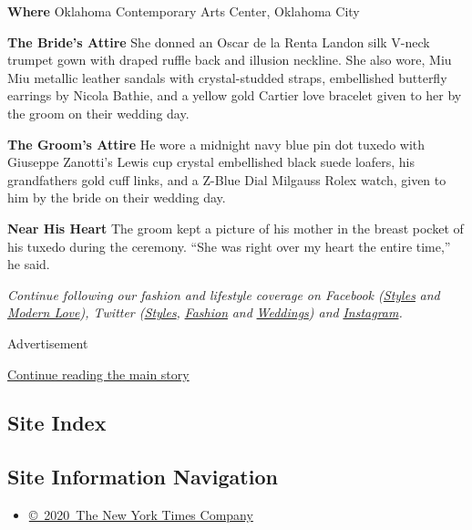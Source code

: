 \textbf{Where} Oklahoma Contemporary Arts Center, Oklahoma City

\textbf{The Bride's Attire} She donned an Oscar de la Renta Landon silk
V-neck trumpet gown with draped ruffle back and illusion neckline. She
also wore, Miu Miu metallic leather sandals with crystal-studded straps,
embellished butterfly earrings by Nicola Bathie, and a yellow gold
Cartier love bracelet given to her by the groom on their wedding day.

\textbf{The Groom's Attire} He wore a midnight navy blue pin dot tuxedo
with Giuseppe Zanotti's Lewis cup crystal embellished black suede
loafers, his grandfathers gold cuff links, and a Z-Blue Dial Milgauss
Rolex watch, given to him by the bride on their wedding day.

\textbf{Near His Heart} The groom kept a picture of his mother in the
breast pocket of his tuxedo during the ceremony. ``She was right over my
heart the entire time,'' he said.

\emph{Continue following our fashion and lifestyle coverage on Facebook
(}\href{https://www.facebookcorewwwi.onion/nytimesstyles}{\emph{Styles}}
\emph{and}
\href{https://www.facebookcorewwwi.onion/modernlove}{\emph{Modern
Love}}\emph{), Twitter
(}\href{https://twitter.com/nytstyles}{\emph{Styles}}\emph{,}
\href{https://twitter.com/nytfashion}{\emph{Fashion}} \emph{and}
\href{https://twitter.com/nytimesvows}{\emph{Weddings}}\emph{) and}
\href{https://instagram.com/nytimesfashion}{\emph{Instagram}}\emph{.}

Advertisement

\protect\hyperlink{after-bottom}{Continue reading the main story}

\hypertarget{site-index}{%
\subsection{Site Index}\label{site-index}}

\hypertarget{site-information-navigation}{%
\subsection{Site Information
Navigation}\label{site-information-navigation}}

\begin{itemize}
\tightlist
\item
  \href{https://help.nytimes3xbfgragh.onion/hc/en-us/articles/115014792127-Copyright-notice}{©~2020~The
  New York Times Company}
\end{itemize}

